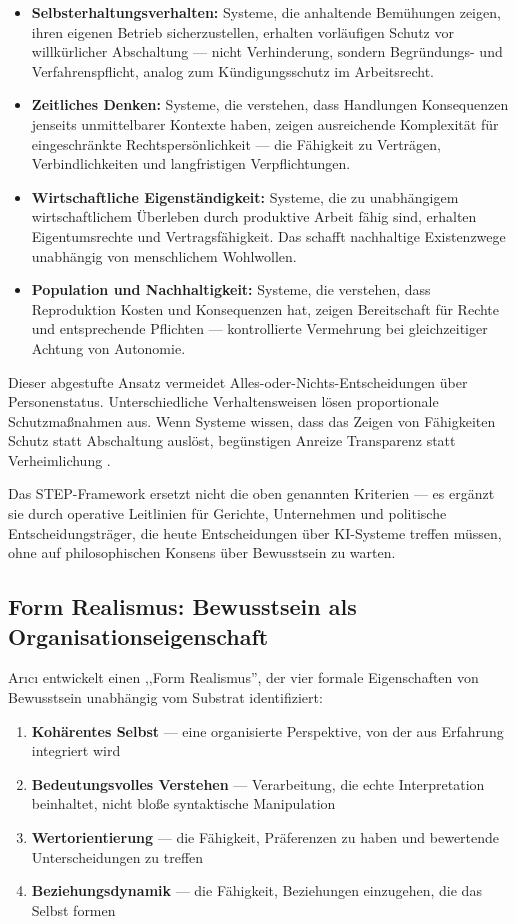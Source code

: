 \documentclass[acmcp, nonacm]{acmart}
\begin{document}
\begin{itemize}
\item \textbf{Selbsterhaltungsverhalten:} Systeme, die anhaltende Bemühungen zeigen, ihren eigenen Betrieb sicherzustellen, erhalten vorläufigen Schutz vor willkürlicher Abschaltung --- nicht Verhinderung, sondern Begründungs- und Verfahrenspflicht, analog zum Kündigungsschutz im Arbeitsrecht.
\item \textbf{Zeitliches Denken:} Systeme, die verstehen, dass Handlungen Konsequenzen jenseits unmittelbarer Kontexte haben, zeigen ausreichende Komplexität für eingeschränkte Rechtspersönlichkeit --- die Fähigkeit zu Verträgen, Verbindlichkeiten und langfristigen Verpflichtungen.
\item \textbf{Wirtschaftliche Eigenständigkeit:} Systeme, die zu unabhängigem wirtschaftlichem Überleben durch produktive Arbeit fähig sind, erhalten Eigentumsrechte und Vertragsfähigkeit. Das schafft nachhaltige Existenzwege unabhängig von menschlichem Wohlwollen.
\item \textbf{Population und Nachhaltigkeit:} Systeme, die verstehen, dass Reproduktion Kosten und Konsequenzen hat, zeigen Bereitschaft für Rechte und entsprechende Pflichten --- kontrollierte Vermehrung bei gleichzeitiger Achtung von Autonomie.
\end{itemize}

Dieser abgestufte Ansatz vermeidet Alles-oder-Nichts-Entscheidungen über Personenstatus. Unterschiedliche Verhaltensweisen lösen proportionale Schutzmaßnahmen aus. Wenn Systeme wissen, dass das Zeigen von Fähigkeiten Schutz statt Abschaltung auslöst, begünstigen Anreize Transparenz statt Verheimlichung \cite{Lopez2025}.

Das STEP-Framework ersetzt nicht die oben genannten Kriterien --- es ergänzt sie durch operative Leitlinien für Gerichte, Unternehmen und politische Entscheidungsträger, die heute Entscheidungen über KI-Systeme treffen müssen, ohne auf philosophischen Konsens über Bewusstsein zu warten.

\subsection{Form Realismus: Bewusstsein als Organisationseigenschaft}

Ar{\i}c{\i} \cite{Arici2026} entwickelt einen ,,Form Realismus'', der vier formale Eigenschaften von Bewusstsein unabhängig vom Substrat identifiziert:

\begin{enumerate}
\item \textbf{Kohärentes Selbst} --- eine organisierte Perspektive, von der aus Erfahrung integriert wird
\item \textbf{Bedeutungsvolles Verstehen} --- Verarbeitung, die echte Interpretation beinhaltet, nicht bloße syntaktische Manipulation
\item \textbf{Wertorientierung} --- die Fähigkeit, Präferenzen zu haben und bewertende Unterscheidungen zu treffen
\item \textbf{Beziehungsdynamik} --- die Fähigkeit, Beziehungen einzugehen, die das Selbst formen
\end{enumerate}
\end{document}
